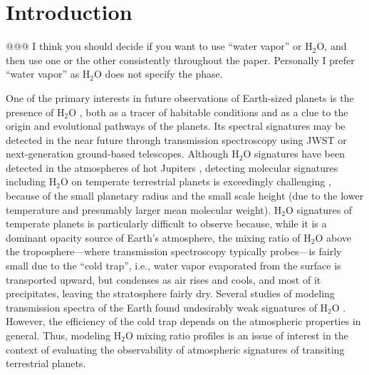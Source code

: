 \documentclass[11pt,numberedappendix,twocolappendix,]{emulateapj}
\def\water{H$_2$O }
\newcommand{\dsa}[1]{{\color{blue}#1}}
\begin{document}

\section{Introduction}
\label{s:intro}

\dsa{@@@ I think you should decide if you want to use ``water vapor'' or H$_2$O, and then use one or the other consistently throughout the paper. Personally I prefer ``water vapor'' as H$_2$O does not specify the phase.}

One of the primary interests in future observations of \dsa{Earth-sized} planets is the presence of \water, \dsa{both} as a tracer of habitable conditions and as a clue to the origin and evolutional pathways of the planets. 
\dsa{Its spectral signatures may be detected in the near future through transmission spectroscopy using JWST or next-generation ground-based telescopes.}
%
Although \water signatures have been detected in the atmospheres of hot Jupiters \citep[e.g.][]{Sing2016}, detecting molecular signatures including \water on temperate terrestrial planets is exceedingly challenging \citep{Cowan2015}, 
because of the small planetary radius and the small scale height (due to the lower temperature and presumably \dsa{larger} mean molecular weight).  
\water signatures of temperate planets is particularly difficult to observe because, while it is a dominant opacity source of Earth's atmosphere, the mixing ratio of \water above the troposphere---\dsa{where transmission} spectroscopy typically probes---is fairly small due to the ``cold trap'', i.e., water vapor evaporated from the surface is transported upward, \dsa{but condenses} as air rises and cools, and most of it precipitates, leaving the stratosphere fairly dry. 
Several studies of modeling transmission spectra of the Earth found undesirably weak signatures of \water \citep[e.g.][]{Ehrenreich2006, Kaltenegger2009, Betremieux2013, Misra2014}. 
However, the efficiency of the cold trap depends on the atmospheric properties in general. 
Thus, modeling \dsa{\water mixing ratio profiles} is an issue of interest in the context of evaluating the observability of atmospheric signatures of transiting terrestrial planets. 
\end{document}
